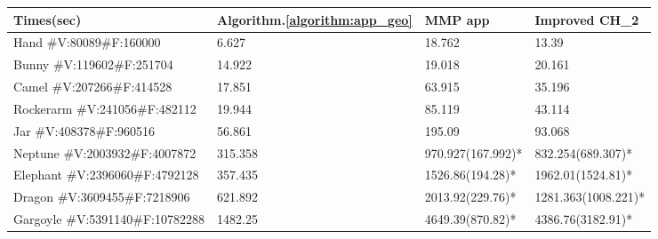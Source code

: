 \renewcommand{\arraystretch}{1.4}%
\renewcommand{\baselinestretch}{1.0}

\setlength{\tabcolsep}{6pt}

\begin{table}[H]
    \centering
    \small
    \begin{tabular}{|p{3.5cm}|p{2cm}|p{2.5cm}|p{2.5cm}|}
        \hline
        Times(sec) & Algorithm.\ref{algorithm:app_geo} & MMP app & Improved CH\_2\\
        \hline
        Hand \#V:80089\newline\#F:160000 & 6.627 & 18.762 & 13.39 \\
        \hline
        Bunny \#V:119602\newline\#F:251704 & 14.922	&  19.018 &	20.161 \\
        \hline
        Camel \#V:207266\newline\#F:414528 & 17.851 & 63.915 & 35.196 \\
        \hline
        Rockerarm \#V:241056\newline\#F:482112 & 19.944 & 85.119 & 43.114 \\
        \hline
        Jar \#V:408378\newline\#F:960516 & 56.861 & 195.09 & 93.068 \\
        \hline
        Neptune \#V:2003932\newline\#F:4007872 & 315.358 & 970.927\newline(167.992)* & 832.254\newline(689.307)* \\
        \hline
        Elephant \#V:2396060\newline\#F:4792128 & 357.435 & 1526.86\newline(194.28)* & 1962.01\newline(1524.81)* \\
        \hline
        Dragon \#V:3609455\newline\#F:7218906 & 621.892 & 2013.92\newline(229.76)* & 1281.363\newline(1008.221)* \\
        \hline
        Gargoyle \#V:5391140\newline\#F:10782288 & 1482.25 & 4649.39\newline(870.82)* & 4386.76\newline(3182.91)*\\

\end{tabular}
\end{table}
